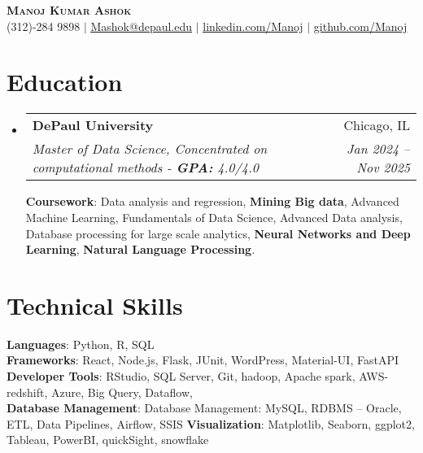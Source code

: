 \documentclass[letterpaper,11pt]{article}
\makeatletter
\newcommand{\resumeSubheading}[4]{
  \vspace{-2pt}\item
    \begin{tabular*}{0.97\textwidth}[t]{l@{\extracolsep{\fill}}r}
      \textbf{#1} & #2 \\
      \textit{\small#3} & \textit{\small #4} \\
    \end{tabular*}\vspace{-7pt}
}
\newcommand{\resumeSubHeadingListStart}{\begin{itemize}[leftmargin=0.15in, label={}]}
\newcommand{\resumeSubHeadingListEnd}{\end{itemize}}
\makeatother
\begin{document}
\begin{center}
    \textbf{\Huge \scshape Manoj Kumar Ashok} \\ \vspace{1pt}
    \small (312)-284 9898 $|$ \href{mailto:mashok@depaul.edu}{\underline{Mashok@depaul.edu}} $|$ 
    \href{https://www.linkedin.com/in/manoj-kumar-ashok-078241211/}{\underline{linkedin.com/Manoj}} $|$
    \href{https://github.com/MK-Github03}{\underline{github.com/Manoj}} 
\end{center}


\section{Education}
  \resumeSubHeadingListStart
 
    \resumeSubheading
      {DePaul University}{Chicago, IL}
      {Master of Data Science, Concentrated on computational methods - \textbf{GPA:} 4.0/4.0}{Jan 2024 -- Nov 2025  }
       \vspace{0.1em}
      
      {\textbf{Coursework}: Data analysis and regression, \textbf{Mining Big data}, Advanced Machine Learning, Fundamentals of Data Science, Advanced Data analysis, Database processing for large scale analytics, \textbf{Neural Networks and Deep Learning}, \textbf{Natural Language Processing}. }
    
  \resumeSubHeadingListEnd
\section{Technical Skills}
 \begin{itemize}[leftmargin=0.15in, label={}]
    \small{\item{
     \textbf{Languages}{: Python, R, SQL} \\
     \textbf{Frameworks}{: React, Node.js, Flask, JUnit, WordPress, Material-UI, FastAPI} \\
     \textbf{Developer Tools}{: RStudio, SQL Server, Git, hadoop, Apache spark, AWS-redshift, Azure, Big Query, Dataflow,} \\
     \textbf{Database Management}{: Database Management: MySQL, RDBMS – Oracle, ETL, Data Pipelines, Airflow, SSIS }
     \textbf{Visualization}{: Matplotlib, Seaborn, ggplot2, Tableau, PowerBI, quickSight, snowflake }
    }}
 \end{itemize}


\end{document}
